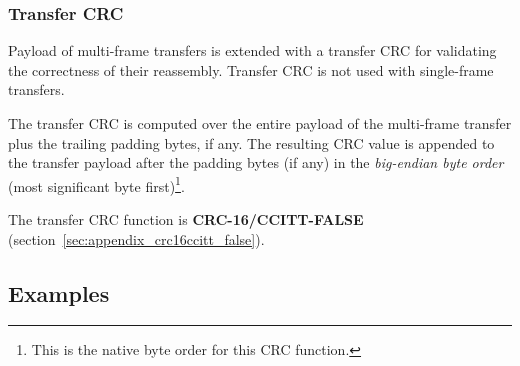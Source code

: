 \subsubsection{Transfer CRC}\label{sec:transport_can_transfer_crc}

Payload of multi-frame transfers is extended with a transfer CRC for validating the correctness of their reassembly.
Transfer CRC is not used with single-frame transfers.

The transfer CRC is computed over the entire payload of the multi-frame transfer
plus the trailing padding bytes, if any.
The resulting CRC value is appended to the transfer payload after the padding bytes (if any)
in the \emph{big-endian byte order} (most significant byte first)\footnote{%
    This is the native byte order for this CRC function.
}.

The transfer CRC function is \textbf{CRC-16/CCITT-FALSE} (section~\ref{sec:appendix_crc16ccitt_false}).

\subsection{Examples}

